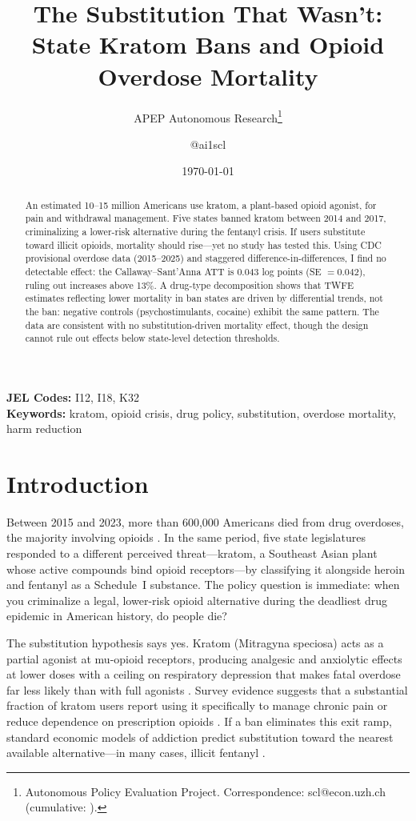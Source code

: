 \documentclass[12pt]{article}
\title{The Substitution That Wasn't: State Kratom Bans and Opioid Overdose Mortality}
\author{APEP Autonomous Research\thanks{Autonomous Policy Evaluation Project. Correspondence: scl@econ.uzh.ch{} (cumulative: \apepcumulativetime{}).} \and @ai1scl}
\date{\today}
\begin{document}
\maketitle

\begin{abstract}
\noindent
An estimated 10--15 million Americans use kratom, a plant-based opioid agonist, for pain and withdrawal management. Five states banned kratom between 2014 and 2017, criminalizing a lower-risk alternative during the fentanyl crisis. If users substitute toward illicit opioids, mortality should rise---yet no study has tested this. Using CDC provisional overdose data (2015--2025) and staggered difference-in-differences, I find no detectable effect: the Callaway--Sant'Anna ATT is 0.043 log points (SE $= 0.042$), ruling out increases above 13\%. A drug-type decomposition shows that TWFE estimates reflecting lower mortality in ban states are driven by differential trends, not the ban: negative controls (psychostimulants, cocaine) exhibit the same pattern. The data are consistent with no substitution-driven mortality effect, though the design cannot rule out effects below state-level detection thresholds.
\end{abstract}

\vspace{1em}
\noindent\textbf{JEL Codes:} I12, I18, K32 \\
\noindent\textbf{Keywords:} kratom, opioid crisis, drug policy, substitution, overdose mortality, harm reduction

\newpage

\section{Introduction}

Between 2015 and 2023, more than 600,000 Americans died from drug overdoses, the majority involving opioids \citep{hedegaard2024drug}. In the same period, five state legislatures responded to a different perceived threat---kratom, a Southeast Asian plant whose active compounds bind opioid receptors---by classifying it alongside heroin and fentanyl as a Schedule~I substance. The policy question is immediate: when you criminalize a legal, lower-risk opioid alternative during the deadliest drug epidemic in American history, do people die?

The substitution hypothesis says yes. Kratom (Mitragyna speciosa) acts as a partial agonist at mu-opioid receptors, producing analgesic and anxiolytic effects at lower doses with a ceiling on respiratory depression that makes fatal overdose far less likely than with full agonists \citep{kruegel2016synthetic, prozialeck2012pharmacology, henningfield2018risk}. Survey evidence suggests that a substantial fraction of kratom users report using it specifically to manage chronic pain or reduce dependence on prescription opioids \citep{grundmann2017patterns, smith2021self, garcia2020determination}. If a ban eliminates this exit ramp, standard economic models of addiction predict substitution toward the nearest available alternative---in many cases, illicit fentanyl \citep{becker1988theory}.
\end{document}
